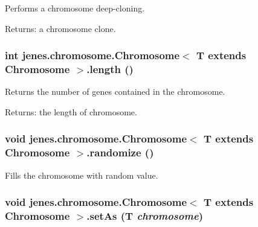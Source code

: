 Performs a chromosome deep-cloning. 

\begin{Desc}
\item[Returns:]a chromosome clone. \end{Desc}
\hypertarget{interfacejenes_1_1chromosome_1_1_chromosome_3_01_t_01extends_01_chromosome_01_4_29f012dd3205c9bdb3fe3b749aa7c927}{
\subsubsection[length]{\setlength{\rightskip}{0pt plus 5cm}int jenes.chromosome.Chromosome$<$ T extends Chromosome $>$.length ()}}
\label{interfacejenes_1_1chromosome_1_1_chromosome_3_01_t_01extends_01_chromosome_01_4_29f012dd3205c9bdb3fe3b749aa7c927}


Returns the number of genes contained in the chromosome. 

\begin{Desc}
\item[Returns:]the length of chromosome. \end{Desc}
\hypertarget{interfacejenes_1_1chromosome_1_1_chromosome_3_01_t_01extends_01_chromosome_01_4_b54ea692387c9a052c6e47191f02f600}{
\subsubsection[randomize]{\setlength{\rightskip}{0pt plus 5cm}void jenes.chromosome.Chromosome$<$ T extends Chromosome $>$.randomize ()}}
\label{interfacejenes_1_1chromosome_1_1_chromosome_3_01_t_01extends_01_chromosome_01_4_b54ea692387c9a052c6e47191f02f600}


Fills the chromosome with random value. \hypertarget{interfacejenes_1_1chromosome_1_1_chromosome_3_01_t_01extends_01_chromosome_01_4_07cb1cba99dd05811c5f5530ffc0642e}{
\subsubsection[setAs]{\setlength{\rightskip}{0pt plus 5cm}void jenes.chromosome.Chromosome$<$ T extends Chromosome $>$.setAs (T {\em chromosome})}}
\label{interfacejenes_1_1chromosome_1_1_chromosome_3_01_t_01extends_01_chromosome_01_4_07cb1cba99dd05811c5f5530ffc0642e}



